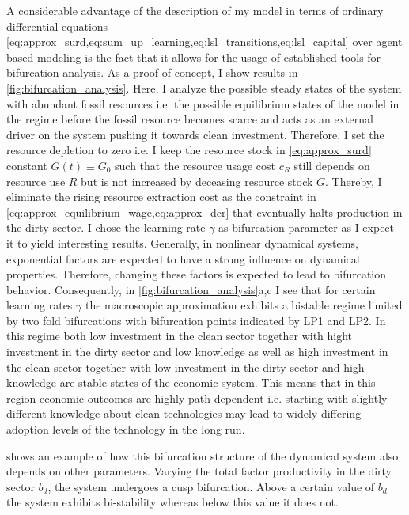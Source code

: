 A considerable advantage of the description of my model in terms of ordinary differential equations \cref{eq:approx_surd,eq:sum_up_learning,eq:lsl_transitions,eq:lsl_capital} over agent based modeling is the fact that it allows for the usage of established tools for bifurcation analysis.
As a proof of concept, I show results in \cref{fig:bifurcation_analysis}.
Here, I analyze the possible steady states of the system with abundant fossil resources i.e. the possible equilibrium states of the model in the regime before the fossil resource becomes scarce and acts as an external driver on the system pushing it towards clean investment.
Therefore, I set the resource depletion to zero i.e. I keep the resource stock in  \cref{eq:approx_surd} constant $G(t) \equiv G_0$ such that the resource usage cost $c_R$ still depends on resource use $R$ but is not increased by deceasing resource stock $G$. Thereby, I eliminate the rising resource extraction cost as the constraint in \cref{eq:approx_equilibrium_wage,eq:approx_dcr} that eventually halts production in the dirty sector. 
I chose the learning rate $\gamma$ as bifurcation parameter as I expect it to yield interesting results.
Generally, in nonlinear dynamical systems, exponential factors are expected to have a strong influence on dynamical properties. Therefore, changing these factors is expected to lead to bifurcation behavior.
Consequently, in \cref{fig:bifurcation_analysis}a,c I see that for certain learning rates $\gamma$ the macroscopic approximation exhibits a bistable regime limited by two fold bifurcations with bifurcation points indicated by LP1 and LP2.
In this regime both low investment in the clean sector together with hight investment in the dirty sector and low knowledge as well as high investment in the clean sector together with low investment in the dirty sector and high knowledge are stable states of the economic system. This means that in this region economic outcomes are highly path dependent i.e. starting with slightly different knowledge about clean technologies may lead to widely differing adoption levels of the technology in the long run.

 shows an example of how this bifurcation structure of the dynamical system also depends on other parameters. Varying the total factor productivity in the dirty sector $b_d$, the system undergoes a cusp bifurcation. Above a certain value of $b_d$ the system exhibits bi-stability whereas below this value it does not.

